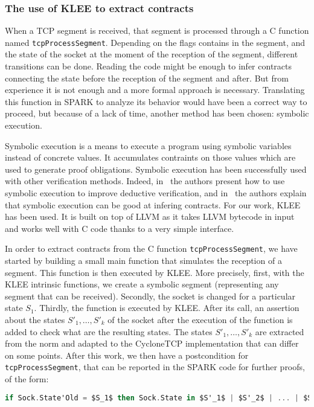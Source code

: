 \documentclass[runningheads]{llncs}
\begin{document}
\subsubsection{The use of KLEE to extract contracts}

    When a TCP segment is received, that segment is processed through a C function named \lstinline{tcpProcessSegment}.
    Depending on the flags contains in the segment, and the state of the socket at the moment of the reception of the segment, different
    transitions can be done. Reading the code might be enough to infer contracts connecting the state before the reception of the segment
    and after. But from experience it is not enough and a more formal approach is necessary. Translating this function in SPARK to analyze
    its behavior would have been a correct way to proceed, but because of a lack of time, another method has been chosen: symbolic execution.

    Symbolic execution is a means to execute a program using symbolic variables instead of concrete values. It accumulates contraints
    on those values which are used to generate proof obligations. Symbolic execution has been successfully used with other verification
    methods. Indeed, in~\cite{vanoverberghe2008using} the authors present how to use symbolic execution to improve deductive verification,
    and in~\cite{kassios2012comparing} the authors explain that symbolic execution can be good at infering contracts.
    For our work, KLEE has been used. It is built on top of LLVM as it takes LLVM bytecode in input
    and works well with C code thanks to a very simple interface.

    In order to extract contracts from the C function \lstinline{tcpProcessSegment}, we have started by building a small main function that
    simulates the reception of a segment. This function is then executed by KLEE. More precisely, first, with the KLEE intrinsic functions, we
    create a symbolic segment (representing any segment that can be received). Secondly, the socket is changed for a particular state $S_1$. Thirdly, the
    function is executed by KLEE. After its call, an assertion about the states $S'_1, \dots, S'_k$ of the socket after the execution
    of the function is added to check what are the resulting states. The states $S'_1, \dots, S'_k$ are extracted from the norm and adapted to the CycloneTCP
    implementation that can differ on some points.
    After this work, we then have a postcondition for \lstinline{tcpProcessSegment}, that can be reported in the SPARK code for further proofs, of the form:
    \begin{lstlisting}[language=Ada,mathescape=true]
    if Sock.State'Old = $S_1$ then Sock.State in $S'_1$ | $S'_2$ | ... | $S'_k$
    \end{lstlisting}
\end{document}
